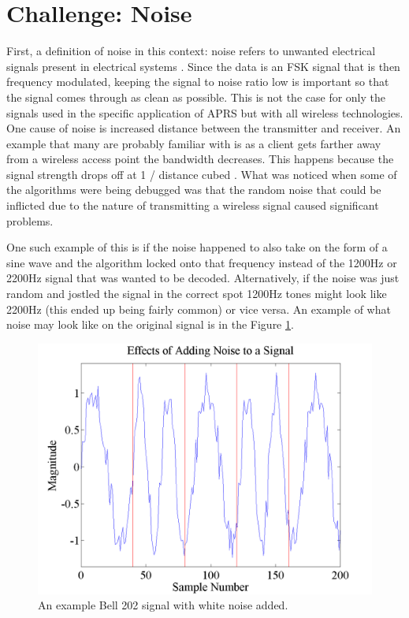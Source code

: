 \section{Challenge: Noise}
First, a definition of noise in this context: noise refers to unwanted electrical signals present in electrical systems \cite{Sklar1988}. Since the data is an FSK signal that is then frequency modulated, keeping the signal to noise ratio low is important so that the signal comes through as clean as possible. This is not the case for only the signals used in the specific application of APRS but with all wireless technologies. One cause of noise is increased distance between the transmitter and receiver. An example that many are probably familiar with is as a client gets farther away from a wireless access point the bandwidth decreases. This happens because the signal strength drops off at 1 / distance cubed \cite{4Gon}. What was noticed when some of the algorithms were being debugged was that the random noise that could be inflicted due to the nature of transmitting a wireless signal caused significant problems.

One such example of this is if the noise happened to also take on the form of a sine wave and the algorithm locked onto that frequency instead of the 1200Hz or 2200Hz signal that was wanted to be decoded. Alternatively, if the noise was just random and jostled the signal in the correct spot 1200Hz tones might look like 2200Hz (this ended up being fairly common) or vice versa. An example of what noise may look like on the original signal is in the Figure \ref{noiseExample}.
\begin{figure}
  \centering
	\includegraphics[width=0.75\linewidth]{images/EffectsofAddingNoisetoaSignal.png} 
	\caption{An example Bell 202 signal with white noise added.}
   \label{noiseExample}
\end{figure}

